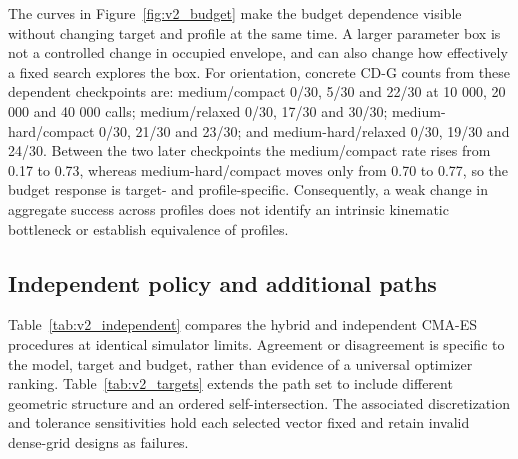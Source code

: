 \documentclass[applsci,article,submit,pdftex,moreauthors]{Definitions/mdpi}
\begin{document}
The curves in Figure~\ref{fig:v2_budget} make the budget dependence visible without changing target and profile at the same time. A larger parameter box is not a controlled change in occupied envelope, and can also change how effectively a fixed search explores the box. For orientation, concrete CD-G counts from these dependent checkpoints are: medium/compact 0/30, 5/30 and 22/30 at 10 000, 20 000 and 40 000 calls; medium/relaxed 0/30, 17/30 and 30/30; medium-hard/compact 0/30, 21/30 and 23/30; and medium-hard/relaxed 0/30, 19/30 and 24/30. Between the two later checkpoints the medium/compact rate rises from 0.17 to 0.73, whereas medium-hard/compact moves only from 0.70 to 0.77, so the budget response is target- and profile-specific. Consequently, a weak change in aggregate success across profiles does not identify an intrinsic kinematic bottleneck or establish equivalence of profiles.

\subsection{Independent policy and additional paths}\label{sec:independent_results}
Table~\ref{tab:v2_independent} compares the hybrid and independent CMA-ES procedures at identical simulator limits. Agreement or disagreement is specific to the model, target and budget, rather than evidence of a universal optimizer ranking. Table~\ref{tab:v2_targets} extends the path set to include different geometric structure and an ordered self-intersection. The associated discretization and tolerance sensitivities hold each selected vector fixed and retain invalid dense-grid designs as failures.
\end{document}
